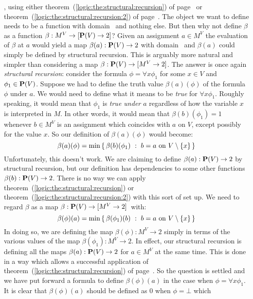 \pv, using either theorem~(\ref{logic:the:structural:recursion}) of
page~\pageref{logic:the:structural:recursion} or
theorem~(\ref{logic:the:structural:recursion:2}) of
page~\pageref{logic:the:structural:recursion:2}. The object we want
to define needs to be a function with domain \pv\ and nothing else.
But then why not define $\beta$ as a function $\beta:M^{V}\to[\mbox{${\bf P}(V)$}\to
2]$? Given an assignment $a\in M^{V}$ the evaluation of $\beta$ at
$a$ would yield a map $\beta(a):\mbox{${\bf P}(V)$}\to 2$ with domain \pv\ and
$\beta(a)$ could simply be defined by structural recursion. This is
arguably more natural and simpler than considering a map
$\beta:\mbox{${\bf P}(V)$}\to[M^{V}\to 2]$. The answer is once again {\em structural
recursion}: consider the formula $\phi=\forall x\phi_{1}$ for some
$x\in V$ and $\phi_{1}\in\mbox{${\bf P}(V)$}$. Suppose we had to define the truth
value $\beta(a)(\phi)$ of the formula $\phi$ under $a$. We would
need to define what it means to be {\em true} for $\forall
x\phi_{1}$. Roughly speaking, it would mean that $\phi_{1}$ is {\em
true under $a$} regardless of how the variable $x$ is interpreted in
$M$. In other words, it would mean that $\beta(b)(\phi_{1})=1$
whenever $b\in M^{V}$ is an assignment which coincides with $a$ on
$V$, except possibly for the value $x$. So our definition of
$\beta(a)(\phi)$ would become:
    \[
    \beta(a)(\phi)=\min\left\{\,\beta(b)(\phi_{1})\ :\  b=a\mbox{\ on\
                    }V\setminus\{x\}\,\right\}
    \]
Unfortunately, this doesn't work. We are claiming to define
$\beta(a):\mbox{${\bf P}(V)$}\to 2$ by structural recursion, but our definition has
dependencies to some other functions $\beta(b):\mbox{${\bf P}(V)$}\to 2$. There is
no way we can apply theorem~(\ref{logic:the:structural:recursion})
or theorem~(\ref{logic:the:structural:recursion:2}) with this sort
of set up. We need to regard $\beta$ as a map $\beta:\mbox{${\bf P}(V)$}\to[M^{V}\to
2]$~with:
    \[
    \beta(\phi)(a)=\min\left\{\,\beta(\phi_{1})(b)\ :\  b=a\mbox{\ on\
                    }V\setminus\{x\}\,\right\}
    \]
In doing so, we are defining the map $\beta(\phi):M^{V}\to 2$ simply
in terms of the various values of the map $\beta(\phi_{1}):M^{V}\to
2$. In effect, our structural recursion is defining all the maps
$\beta(a):\mbox{${\bf P}(V)$}\to 2$ for $a\in M^{V}$ at the same time. This is done
in a way which allows a successful application of
theorem~(\ref{logic:the:structural:recursion}) of
page~\pageref{logic:the:structural:recursion}. So the question is
settled and we have put forward a formula to define $\beta(\phi)(a)$
in the case when $\phi=\forall x\phi_{1}$. It is clear that
$\beta(\phi)(a)$ should be defined as $0$ when $\phi=\bot$ which
